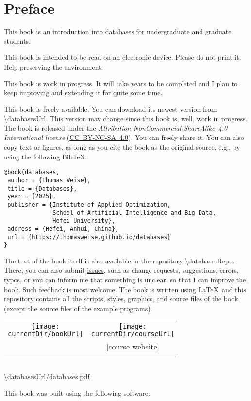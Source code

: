 \chapter*{Preface}%
%
%
This book is an introduction into databases for undergraduate and graduate students.

This book is intended to be read on an electronic device.
Please do not print it.
Help preserving the environment.

This book is work in progress.
It will take years to be completed and I plan to keep improving and extending it for quite some time.

This book is freely available.
You can download its newest version from \expandafter\url{\databasesUrl}.
This version may change since this book is, well, work in progress.
The book is released under the \emph{Attribution-NonCommercial-ShareAlike~4.0 International license} (\href{http://creativecommons.org/licenses/by-nc-sa/4.0/}{\mbox{CC~BY-NC-SA~4.0}}).
You can freely share it.
You can also copy text or figures, as long as you cite the book as the original source, e.g., by using the following Bib\TeX:%
%
\begin{lstlisting}[style=text_style]
@book{databases,
 author = {Thomas Weise},
 title = {Databases},
 year = {2025},
 publisher = {Institute of Applied Optimization,
              School of Artificial Intelligence and Big Data,
              Hefei University},
 address = {Hefei, Anhui, China},
 url = {https://thomasweise.github.io/databases}
}
\end{lstlisting}
%
%
\begin{sloppypar}%
The text of the book itself is also available in the repository \url{\databasesRepo}.
There, you can also submit \href{\databasesRepo/issues}{issues}, such as change requests, suggestions, errors, typos, or you can inform me that something is unclear, so that I can improve the book.
Such feedback is most welcome.
The book is written using \LaTeX\ and this repository contains all the scripts, styles, graphics, and source files of the book (except the source files of the example programs).%
\end{sloppypar}%
%
\strut\vfill\strut%
%
%
%
\clearpage%
%
\strut\vfill\strut%
%
\begin{center}%
\noindent\begin{tabular}{c@{~~~~~~~~~~~~}c}%
\texttt{[image: \\currentDir/bookUrl]}&\texttt{[image: \\currentDir/courseUrl]}\\\relax%
[\expandafter\href{\databasesUrl/databases.pdf}{book pdf}]&[\expandafter\href{\databasesUrl}{course website}]\\%
\end{tabular}\\[12pt]%
\noindent\expandafter\url{\databasesUrl/databases.pdf}%
\end{center}%
%
\strut\vfill\strut%
This book was built using the following software:%
%

